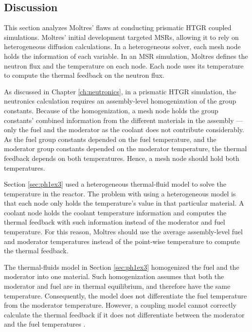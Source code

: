 \subsection{Discussion}
\label{sec:discuss}

This section analyzes Moltres' flaws at conducting prismatic HTGR coupled simulations.
Moltres' initial development targeted MSRs, allowing it to rely on heterogeneous diffusion calculations.
In a heterogeneous solver, each mesh node holds the information of each variable.
In an MSR simulation, Moltres defines the neutron flux and the temperature on each node.
Each node uses its temperature to compute the thermal feedback on the neutron flux.

As discussed in Chapter \ref{ch:neutronics}, in a prismatic HTGR simulation, the neutronics calculation requires an assembly-level homogenization of the group constants.
Because of the homogenization, a mesh node holds the group constants' combined information from the different materials in the assembly --- only the fuel and the moderator as the coolant does not contribute considerably.
As the fuel group constants depended on the fuel temperature, and the moderator group constants depended on the moderator temperature, the thermal feedback depends on both temperatures.
Hence, a mesh node should hold both temperatures.

Section \ref{sec:ph1ex3} used a heterogeneous thermal-fluid model to solve the temperature in the reactor.
The problem with using a heterogeneous model is that each node only holds the temperature's value in that particular material.
A coolant node holds the coolant temperature information and computes the thermal feedback with such information instead of the moderator and fuel temperature.
For this reason, Moltres should use the average assembly-level fuel and moderator temperatures instead of the point-wise temperature to compute the thermal feedback.

The thermal-fluids model in Section \ref{sec:ph1ex3} homogenized the fuel and the moderator into one material.
Such homogenization assumes that both the moderator and fuel are in thermal equilibrium, and therefore have the same temperature.
Consequently, the model does not differentiate the fuel temperature from the moderator temperature.
However, a coupling model cannot correctly calculate the thermal feedback if it does not differentiate between the moderator and the fuel temperatures \cite{damian_vhtr_2008}.

